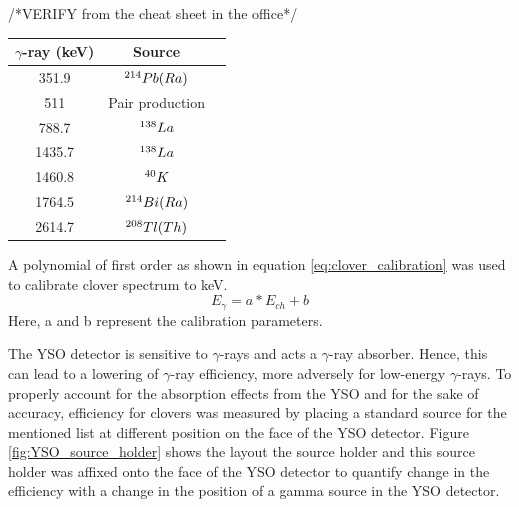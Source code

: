 /*VERIFY from the cheat sheet in the office*/
\begin{center}
	\begin{tabular}{ |c|c|c| } 
		\hline
		$\gamma$-ray (keV) & Source \\
		\hline
		351.9 & $\textsuperscript{214}Pb(Ra)$ \\ 
		511 & Pair production \\ 
		788.7 & $\textsuperscript{138}La$ \\ 
		1435.7 & $\textsuperscript{138}La$ \\ 
		1460.8 & $\textsuperscript{40}K$ \\ 
		1764.5 & $\textsuperscript{214}Bi(Ra)$ \\ 
		2614.7 & $\textsuperscript{208}Tl(Th)$ \\ 
		\hline
	\end{tabular}
\end{center}

A polynomial of first order as shown in equation \ref{eq:clover_calibration} was used to calibrate clover spectrum to keV.
\begin{equation} \label{eq:clover_calibration}
E_{\gamma} = a*E_{ch} + b
\end{equation}
Here, a and b represent the calibration parameters.



The YSO detector is sensitive to $\gamma$-rays and acts a $\gamma$-ray absorber. Hence, this can lead to a lowering of $\gamma$-ray efficiency, more adversely for low-energy $\gamma$-rays. To properly account for the absorption effects from the YSO and for the sake of accuracy, efficiency for clovers was measured by placing a standard source for the mentioned list at different position on the face of the YSO detector. Figure \ref{fig:YSO_source_holder} shows the layout the source holder and this source holder was affixed onto the face of the YSO detector to quantify change in the efficiency with a change in the position of a gamma source in the YSO detector.

